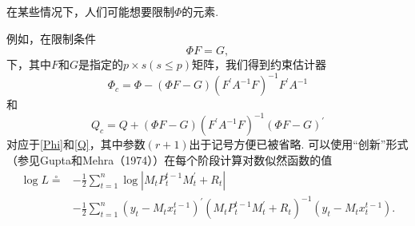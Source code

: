 \documentclass[UTF8,12pt]{ctexart}
\numberwithin{equation}{section}%
\begin{document}
	在某些情况下，人们可能想要限制$\Phi$的元素. 
	
	例如，在限制条件
	$$
	\Phi F=G,
	$$
	下，其中$F$和$G$是指定的$p \times s(s \leqslant p)$矩阵，我们得到约束估计器
	$$
	\Phi_c=\Phi-(\Phi F-G)\left(F^{\prime} A^{-1} F\right)^{-1} F^{\prime} A^{-1}
	$$
	和
	$$
	Q_c=Q+(\Phi F-G)\left(F^{\prime} A^{-1} F\right)^{-1}(\Phi F-G)^{\prime}
	$$
	对应于\eqref{Phi}和\eqref{Q}，其中参数$(r+1)$出于记号方便已被省略. 
	可以使用“创新”形式（参见Gupta和Mehra（1974））在每个阶段计算对数似然函数的值
	$$
	\begin{aligned}
		\log L \stackrel{\circ}{=} & -\frac{1}{2} \sum_{t=1}^n \log \left|M_t P_t^{t-1} M_t^{\prime}+R_t\right| \\
		& -\frac{1}{2} \sum_{t=1}^n\left(y_t-M_t x_t^{t-1}\right)^{\prime}\left(M_t P_t^{t-1} M_t^{\prime}+R_t\right)^{-1}\left(y_t-M_t x_t^{t-1}\right) .
	\end{aligned}
	$$
	
	
	
	\newpage
	
\end{document}
